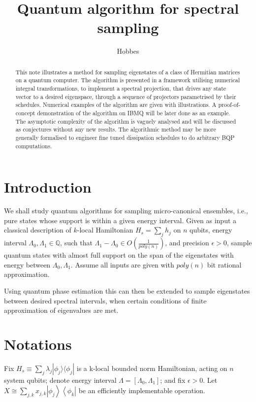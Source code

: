 \documentclass[10pt]{amsart}
\title{Quantum algorithm for spectral sampling}
\author{Hobbes}
\newcommand{\dmat}[1]{{| #1 \rangle \langle #1 |}}
\newcommand{\dm}[2]{\left|#1\right\rangle\left\langle#2\right|}
\begin{document}
\maketitle

\begin{abstract}

    This note illustrates a method for sampling eigenstates of a class of Hermitian matrices on a quantum computer. The algorithm is presented in a framework utilising numerical integral transformations, to implement a spectral projection, that drives any state vector to a desired eigenspace, through a sequence of projectors parametrised by their schedules. 
    Numerical examples of the algorithm are given with illustrations.
    A proof-of-concept demonstration of the algorithm on IBMQ will be later done as an example. The asymptotic complexity of the algorithm is vaguely analysed and will be discussed as conjectures without any new results. The algorithmic method may be more generally formalised to engineer fine tuned dissipation schedules to do arbitrary BQP computations.
\end{abstract}


\section{Introduction}


We shall study quantum algorithms for sampling micro-canonical ensembles, i.e., pure states whose support is within a given energy interval. Given as input a classical description of $k$-local Hamiltonian $H_s = \sum_j h_j$ on $n$ qubits, energy interval $\Lambda_0, \Lambda_1 \in \mathbb{Q}$, such that $\Lambda_1-\Lambda_0 \in O(\frac{1}{poly(n)})$, and precision $\epsilon>0$, sample quantum states with almost full support on the span of the eigenstates with energy between $\Lambda_0, \Lambda_1$. Assume all inputs are given with $poly(n)$ bit rational approximation. 

Using quantum phase estimation this can then be extended to sample eigenstates between desired spectral intervals, when certain conditions of finite approximation of eigenvalues are met. 


\section{Notations}
Fix $H_s \equiv \sum_{j} \lambda_j \dmat{\phi_j}$ is a k-local  bounded norm Hamiltonian, acting on $n$ system qubits; denote energy interval $\Lambda = [\Lambda_0, \Lambda_1]$; and fix $\epsilon>0$.
Let $X \cong \sum_{j,k} x_{j,k} \dm{\phi_j}{\phi_k}$ be an efficiently implementable operation.  
\end{document}
